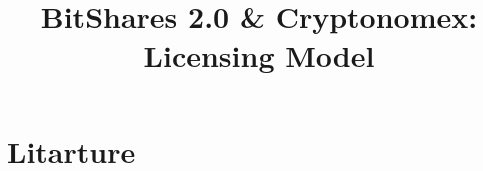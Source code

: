 \documentclass[conference,final,10pt,a4paper]{IEEEtran}
\title{BitShares 2.0 \& Cryptonomex: Licensing Model}
\begin{document}
\sloppy
\maketitle

\begin{abstract}
\end{abstract}
\section*   { Litarture                                      }
\end{document}
